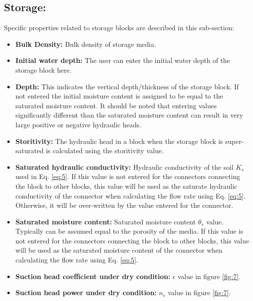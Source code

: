 \subsection{Storage: }
Specific properties related to storage blocks are described in this sub-section: 
\begin{itemize}
\item \textbf{Bulk Density: } Bulk density of storage media. 
\item \textbf{Initial water depth: } The user can enter the initial water depth of the storage block here. 
\item \textbf{Depth: } This indicates the vertical depth/thickness of the storage block. If not entered the initial moisture content is assigned to be equal to the saturated moisture content. It should be noted that entering values significantly different than the saturated moisture content can result in very large positive or negative hydraulic heads. 
\item \textbf{Storitivity: } The hydraulic head in a block when the storage block is super-saturated is calculated using the storitivity value. 
\item \textbf{Saturated hydraulic conductivity: } Hydraulic conductivity of the soil $K_s$ used in Eq. \ref{eq:5}. If this value is not entered for the connectors connecting the block to other blocks, this value will be used as the saturate hydraulic conductivity of the connector when calculating the flow rate using Eq. \ref{eq:5}. Otherwise, it will be over-written by the value entered for the connector. 
\item \textbf{Saturated moisture content: } Saturated moisture content $\theta_s$ value. Typically can be assumed equal to the porosity of the media. If this value is not entered for the connectors connecting the block to other blocks, this value will be used as the saturated moisture content of the connector when calculating the flow rate using Eq. \ref{eq:5}. 
\item \textbf{Suction head coefficient under dry condition: } $\epsilon$ value in figure \ref{fig:7}.
\item \textbf{Suction head power under dry condition: } $n_e$ value in figure \ref{fig:7}.
\end{itemize}
